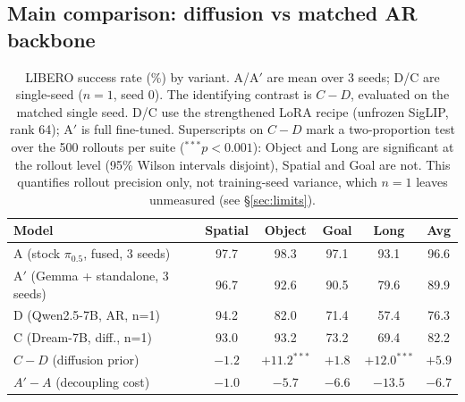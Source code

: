 \documentclass[conference]{IEEEtran}
\begin{document}
\subsection{Main comparison: diffusion vs matched AR backbone}
\label{sec:main}
\begin{table}[t]
\centering
\caption{LIBERO success rate (\%) by variant. A/A$'$ are mean over 3 seeds;
D/C are single-seed ($n{=}1$, seed 0). The identifying contrast is $C-D$,
evaluated on the matched single seed. D/C use the strengthened LoRA recipe
(unfrozen SigLIP, rank 64); A$'$ is full fine-tuned. Superscripts on $C-D$ mark a
two-proportion test over the 500 rollouts per suite ($^{\ast\ast\ast}p<0.001$):
Object and Long are significant at the rollout level (95\% Wilson intervals
disjoint), Spatial and Goal are not. This quantifies rollout precision only, not
training-seed variance, which $n{=}1$ leaves unmeasured (see \S\ref{sec:limits}).}
\begin{tabular}{lccccc}
\toprule
Model & Spatial & Object & Goal & Long & Avg \\
\midrule
A (stock $\pi_{0.5}$, fused, 3 seeds) & 97.7 & 98.3 & 97.1 & 93.1 & 96.6 \\
A$'$ (Gemma + standalone, 3 seeds)    & 96.7 & 92.6 & 90.5 & 79.6 & 89.9 \\
D (Qwen2.5-7B, AR, n{=}1)             & 94.2 & 82.0 & 71.4 & 57.4 & 76.3 \\
C (Dream-7B, diff., n{=}1)   & 93.0 & 93.2 & 73.2 & 69.4 & 82.2 \\
\midrule
$C-D$ (diffusion prior)      & $-1.2$ & $+11.2^{\ast\ast\ast}$ & $+1.8$ & $+12.0^{\ast\ast\ast}$ & $+5.9$ \\
$A'\!-\!A$ (decoupling cost) & $-1.0$ & $-5.7$ & $-6.6$ & $-13.5$ & $-6.7$ \\
\bottomrule
\end{tabular}
\end{table}
\end{document}

